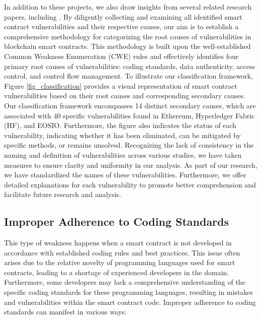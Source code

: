 \documentclass[manuscript,screen]{acmart}
\begin{document}
In addition to these projects, we also draw insights from several related research papers, including \cite{AtzeiBCLZ18, LvWWZ21, HeZ00L0YJ21, perez2021smart, hu2021comprehensive, rameder2022review}. By diligently collecting and examining all identified smart contract vulnerabilities and their respective causes, our aim is to establish a comprehensive methodology for categorizing the root causes of vulnerabilities in blockchain smart contracts. This methodology is built upon the well-established Common Weakness Enumeration (CWE) rules and effectively identifies four primary root causes of vulnerabilities: coding standards, data authenticity, access control, and control flow management. To illustrate our classification framework, Figure \ref{fig_classification} provides a visual representation of smart contract vulnerabilities based on their root causes and corresponding secondary causes. Our classification framework encompasses 14 distinct secondary causes, which are associated with 40 specific vulnerabilities found in Ethereum, Hyperledger Fabric (HF), and EOSIO. Furthermore, the figure also indicates the status of each vulnerability, indicating whether it has been eliminated, can be mitigated by specific methods, or remains unsolved. 
Recognizing the lack of consistency in the naming and definition of vulnerabilities across various studies, we have taken measures to ensure clarity and uniformity in our analysis. As part of our research, we have standardized the names of these vulnerabilities. Furthermore, we offer detailed explanations for each vulnerability to promote better comprehension and facilitate future research and analysis.

\subsection{Improper Adherence to Coding Standards}
This type of weakness happens when a smart contract is not developed in accordance with established coding rules and best practices. This issue often arises due to the relative novelty of programming languages used for smart contracts, leading to a shortage of experienced developers in the domain. Furthermore, some developers may lack a comprehensive understanding of the specific coding standards for these programming languages, resulting in mistakes and vulnerabilities within the smart contract code. Improper adherence to coding standards can manifest in various ways:
\end{document}

